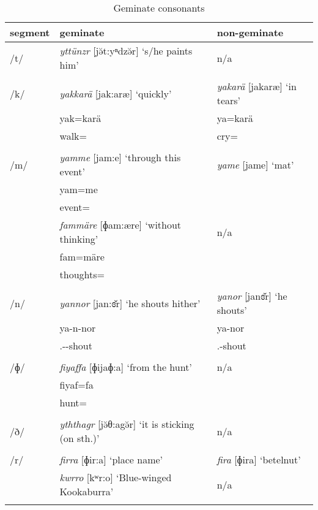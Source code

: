 \begin{table}
\caption{Geminate consonants}
\label{geminates}
	\begin{tabularx}{\textwidth}{lll}
		\lsptoprule
		{segment} & {geminate} & {non-geminate} \\ \midrule
		/t/ & \emph{yttünzr} [jə̆t:y{ⁿ}dzə̆r] `s/he paints him' & n/a \\
		&&\\
		/k/& \emph{yakkarä} [jak:aræ] `quickly' & \emph{yakarä} [jakaræ] `in tears'\\
		& {\footnotesize yak=karä} & {\footnotesize ya=karä} \\
		& {\footnotesize walk=\Prop} & {\footnotesize cry=\Prop}\\
		&&\\
		/m/& \emph{yamme} [jam:e] `through this event' & \emph{yame} [jame] `mat' \\
		& {\footnotesize yam=me} & \\
		& {\footnotesize event=\Ins} & \\
		& \emph{fammäre} [ɸam:ære] `without thinking' & n/a \\
		&{\footnotesize fam=märe} & \\
		&{\footnotesize thoughts=\Priv} & \\
		&&\\
		/n/& \emph{yannor} [jan:ɞ̆r] `he shouts hither' & \emph{yanor} [janɞ̆r] `he shouts'\\
		&{\footnotesize ya-n-nor} & {\footnotesize ya-nor} \\
		&{\footnotesize \Tsg.\Masc-\Venit-shout} & {\footnotesize \Tsg.\Masc-shout}\\
		&&\\
		/ɸ/& \emph{fiyaffa} [ɸijaɸ:a] `from the hunt' & n/a \\
		&{\footnotesize fiyaf=fa} & \\
		&{\footnotesize hunt=\Abl} & \\
		&&\\
		/ð/& \emph{yththagr} [jə̆θ:a{\ᵑ}gə̆r] `it is sticking (on sth.)' 	& n/a \\
		&&\\
		/r/& \emph{firra} [ɸir:a] `place name' & \emph{fira} [ɸira] `betelnut'\\
		& \emph{kwrro} [kʷr:o] `Blue-winged Kookaburra' & n/a \\
		\lspbottomrule
	\end{tabularx}
\end{table}%

